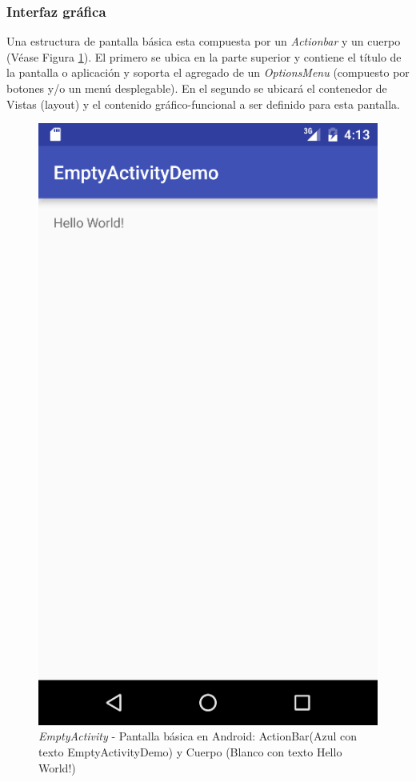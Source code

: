     \subsubsection{Interfaz gráfica}
    
    \par Una estructura de pantalla básica esta compuesta por un \textit{Actionbar} y un cuerpo (Véase Figura \ref{fig:emptyActivity}). El primero se ubica en la parte superior  y contiene el título de la pantalla o aplicación y soporta el agregado de un \textit{OptionsMenu} (compuesto por botones y/o un menú desplegable). En el segundo se ubicará el contenedor de Vistas (layout) y el contenido gráfico-funcional a ser definido para esta pantalla.
    
    \begin{figure}
        \centering
        \includegraphics[scale=0.5]{software/EmptyActivity.jpg}
        \caption{\textit{EmptyActivity} - Pantalla básica en Android: ActionBar(Azul con texto EmptyActivityDemo) y Cuerpo (Blanco con texto Hello World!)}
        \label{fig:emptyActivity}
    \end{figure}
    

